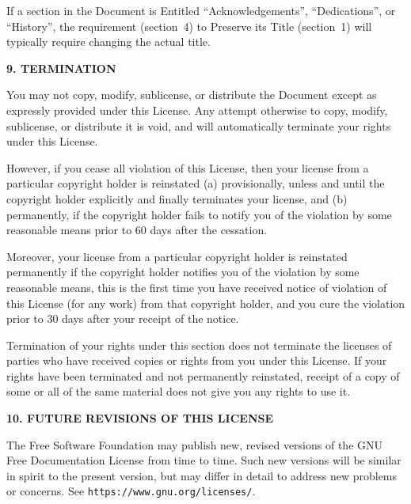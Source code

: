 \documentclass[a4paper,11pt]{book}
\begin{document}
If a section in the Document is Entitled ``Acknowledgements'',
``Dedications'', or ``History'', the requirement (section~4) to Preserve
its Title (section~1) will typically require changing the actual
title.


\begin{center}
	{\Large\bf 9. TERMINATION\par}
\end{center}


You may not copy, modify, sublicense, or distribute the Document
except as expressly provided under this License.  Any attempt
otherwise to copy, modify, sublicense, or distribute it is void, and
will automatically terminate your rights under this License.

However, if you cease all violation of this License, then your license
from a particular copyright holder is reinstated (a) provisionally,
unless and until the copyright holder explicitly and finally
terminates your license, and (b) permanently, if the copyright holder
fails to notify you of the violation by some reasonable means prior to
60 days after the cessation.

Moreover, your license from a particular copyright holder is
reinstated permanently if the copyright holder notifies you of the
violation by some reasonable means, this is the first time you have
received notice of violation of this License (for any work) from that
copyright holder, and you cure the violation prior to 30 days after
your receipt of the notice.

Termination of your rights under this section does not terminate the
licenses of parties who have received copies or rights from you under
this License.  If your rights have been terminated and not permanently
reinstated, receipt of a copy of some or all of the same material does
not give you any rights to use it.


\begin{center}
	{\Large\bf 10. FUTURE REVISIONS OF THIS LICENSE\par}
\end{center}


The Free Software Foundation may publish new, revised versions
of the GNU Free Documentation License from time to time.  Such new
versions will be similar in spirit to the present version, but may
differ in detail to address new problems or concerns.  See
\texttt{https://www.gnu.org/licenses/}.
\end{document}
